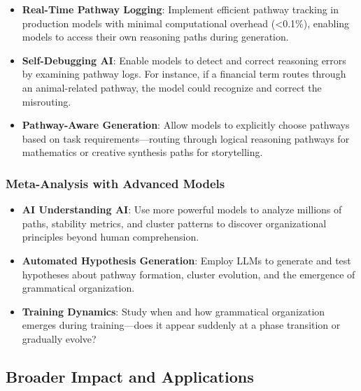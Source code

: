 \begin{itemize}
    \item \textbf{Real-Time Pathway Logging}: Implement efficient pathway tracking in production models with minimal computational overhead (<0.1\%), enabling models to access their own reasoning paths during generation.
    
    \item \textbf{Self-Debugging AI}: Enable models to detect and correct reasoning errors by examining pathway logs. For instance, if a financial term routes through an animal-related pathway, the model could recognize and correct the misrouting.
    
    \item \textbf{Pathway-Aware Generation}: Allow models to explicitly choose pathways based on task requirements—routing through logical reasoning pathways for mathematics or creative synthesis paths for storytelling.
\end{itemize}

\subsubsection{Meta-Analysis with Advanced Models}

\begin{itemize}
    \item \textbf{AI Understanding AI}: Use more powerful models to analyze millions of paths, stability metrics, and cluster patterns to discover organizational principles beyond human comprehension.
    
    \item \textbf{Automated Hypothesis Generation}: Employ LLMs to generate and test hypotheses about pathway formation, cluster evolution, and the emergence of grammatical organization.
    
    \item \textbf{Training Dynamics}: Study when and how grammatical organization emerges during training—does it appear suddenly at a phase transition or gradually evolve?
\end{itemize}

\subsection{Broader Impact and Applications}

